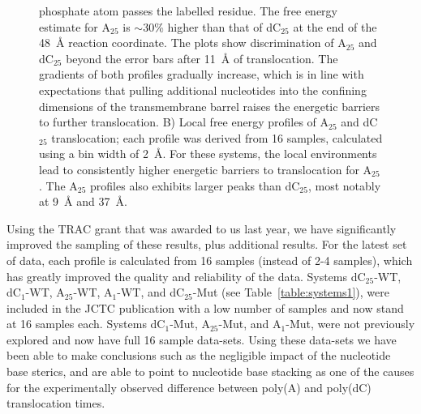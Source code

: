 \documentclass[a4paper,10pt]{article}
\newcommand{\dctf}{dC$_{25}$ }
\newcommand{\dctfnsp}{dC$_{25}$}
\newcommand{\atf}{A$_{25}$ }
\newcommand{\atfnsp}{A$_{25}$}
\newcommand{\dconsp}{dC$_{1}$}
\newcommand{\aonsp}{A$_{1}$}
\begin{document}
\begin{figure}[!h]
{phosphate atom passes the labelled residue. The free energy estimate for \atf is $\sim$30\% higher than that of \dctf at the end of the 48~{\AA} reaction coordinate. The plots show discrimination of \atf and \dctf beyond the error bars after 11~{\AA} of translocation. The gradients of both profiles gradually increase, which is in line with expectations that pulling additional nucleotides into the confining dimensions of the transmembrane barrel raises the energetic barriers to further translocation. B) Local free energy profiles of \atf and \dctf translocation; each profile was derived from 16 samples, calculated using a bin width of 2~{\AA}. For these systems, the local environments lead to consistently higher energetic barriers to translocation for \atfnsp. The \atf profiles also exhibits larger peaks than \dctfnsp, most notably at 9~{\AA} and 37~{\AA}.}
  \label{full_trans_local}
\end{figure}



Using the TRAC grant that was awarded to us last year, we have significantly improved the sampling of these results, plus additional results. For the latest set of data, each profile is calculated from 16 samples (instead of 2-4 samples), which has greatly improved the quality and reliability of the data. Systems \dctfnsp-WT,  \dconsp-WT, \atfnsp-WT,  \aonsp-WT,  and \dctfnsp-Mut (see Table~\ref{table:systems1}), were included in the JCTC publication with a low number of samples and now stand at 16 samples each. Systems \dconsp-Mut, \atfnsp-Mut, and \aonsp-Mut, were not previously explored and now have full 16 sample data-sets. Using these data-sets we have been able to make conclusions such as the negligible impact of the nucleotide base sterics, and are able to point to nucleotide base stacking as  one of the causes for the experimentally observed difference between poly(A) and poly(dC) translocation times.
\end{document}
